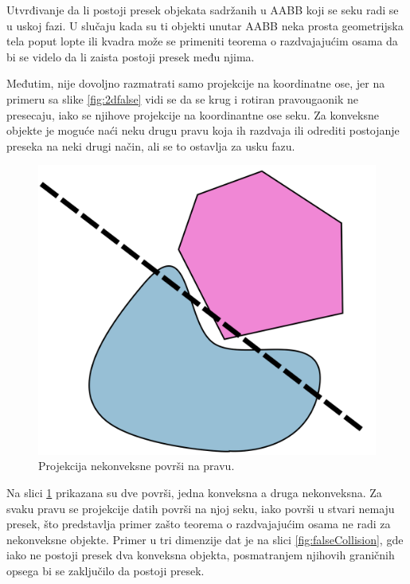 \documentclass[12pt,oneside]{memoir}
\begin{document}
Utvrđivanje da li postoji presek objekata sadržanih u AABB koji se seku radi se u uskoj fazi.
U slučaju kada su ti objekti unutar AABB neka prosta geometrijska tela poput
lopte ili kvadra može se primeniti teorema o razdvajajućim osama da bi se videlo da li zaista postoji presek među njima. 


Međutim, nije dovoljno razmatrati samo projekcije na koordinatne ose, 
jer na primeru sa slike \ref{fig:2dfalse} vidi se da se krug i rotiran pravougaonik ne presecaju, iako se njihove projekcije 
na koordinantne ose seku. Za konveksne objekte je moguće naći neku drugu pravu koja ih razdvaja ili odrediti postojanje preseka 
na neki drugi način, ali se to ostavlja za usku fazu.

\begin{figure}[h!]
	\begin{center}
	\includegraphics[scale=0.17]{theorem_counterexample.png}
	\end{center}
	\caption{Projekcija nekonveksne površi na pravu.}
	\label{fig:counter}
\end{figure}

Na slici \ref{fig:counter} prikazana su dve površi, jedna konveksna a druga nekonveksna. 
Za svaku pravu se projekcije datih površi na njoj seku, iako površi u stvari nemaju presek, što predstavlja
primer zašto teorema o razdvajajućim osama ne radi za nekonveksne objekte. 
Primer u tri dimenzije dat je na slici \ref{fig:falseCollision}, gde iako ne postoji presek dva konveksna objekta, 
posmatranjem njihovih graničnih opsega bi se zaključilo da postoji presek.
\end{document}
